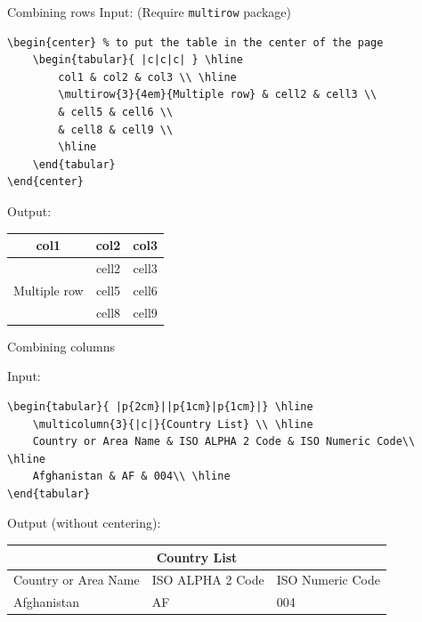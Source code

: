 \documentclass [xcolor=svgnames, t] {beamer}
\begin{document}
\begin{frame}[fragile]{Combining rows}
        Input: (Require \texttt{multirow} package)
        \begin{lstlisting}
\begin{center} % to put the table in the center of the page
    \begin{tabular}{ |c|c|c| } \hline
        col1 & col2 & col3 \\ \hline
        \multirow{3}{4em}{Multiple row} & cell2 & cell3 \\ 
        & cell5 & cell6 \\ 
        & cell8 & cell9 \\ 
        \hline
    \end{tabular}
\end{center}
\end{lstlisting}
        Output:
        \begin{center}
            \begin{tabular}{ |c|c|c| }
                \hline
                col1                            & col2  & col3  \\
                \hline
                \multirow{3}{4em}{Multiple row} & cell2 & cell3 \\
                                                & cell5 & cell6 \\
                                                & cell8 & cell9 \\
                \hline
            \end{tabular}
        \end{center}
\end{frame}

\begin{frame}[fragile]{Combining columns}

        Input:
        \begin{lstlisting}
\begin{tabular}{ |p{2cm}||p{1cm}|p{1cm}|} \hline 
    \multicolumn{3}{|c|}{Country List} \\ \hline 
    Country or Area Name & ISO ALPHA 2 Code & ISO Numeric Code\\ \hline
    Afghanistan & AF & 004\\ \hline
\end{tabular}
\end{lstlisting}
        Output (without centering):\\
        \begin{tabular}{ |p{2cm}||p{1cm}|p{1cm}|}
            \hline
            \multicolumn{3}{|c|}{Country List}                         \\
            \hline
            Country or Area Name & ISO ALPHA 2 Code & ISO Numeric Code \\
            \hline
            Afghanistan          & AF               & 004              \\
            \hline
        \end{tabular}
\end{frame}
\end{document}
